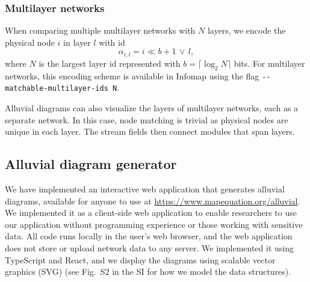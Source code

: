 \documentclass[aps,rmp,floats,floatfix,twocolumn,superscriptaddress,final]{revtex4-2}
\begin{document}
\subsubsection*{Multilayer networks}

When comparing multiple multilayer networks with $N$ layers, we encode the physical node $i$ in layer $l$ with id
%
\begin{equation}
    \alpha_{i,l} = i \ll b + 1 \, \lor \, l,
\end{equation}
%
where $N$ is the largest layer id represented with $b = \lceil \log_2 N \rceil$ bits.
For multilayer networks, this encoding scheme is available in Infomap using the flag \texttt{-{}-matchable-multilayer-ids N}.

Alluvial diagrams can also visualize the layers of multilayer networks, each as a separate network.
In this case, node matching is trivial as physical nodes are unique in each layer.
The stream fields then connect modules that span layers.

\subsection*{Alluvial diagram generator}

We have implemented an interactive web application that generates alluvial diagrams, available for anyone to use at {\small\url{https://www.mapequation.org/alluvial}}.
We implemented it as a client-side web application to enable researchers to use our application without programming experience or those working with sensitive data.
All code runs locally in the user's web browser, and the web application does not store or upload network data to any server.
We implemented it using TypeScript and React, and we display the diagrams using scalable vector graphics (SVG) (see Fig.~S2 in the SI for how we model the data structures).
\end{document}
